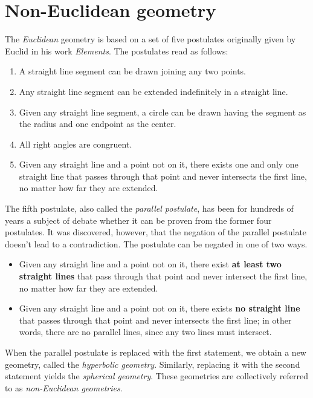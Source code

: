 \section{Non-Euclidean geometry}

The \textit{Euclidean} geometry is based on a set of five postulates originally given by Euclid in his work \textit{Elements}.
The postulates read as follows:
\begin{enumerate}
    \item A straight line segment can be drawn joining any two points.
    \item Any straight line segment can be extended indefinitely in a straight line.
    \item Given any straight line segment, a circle can be drawn having the segment as the radius and one endpoint as the center.
    \item All right angles are congruent.
    \item Given any straight line and a point not on it, there exists one and only one straight line that passes through that point and never intersects the first line, no matter how far they are extended.
\end{enumerate}
The fifth postulate, also called the \textit{parallel postulate}, has been for hundreds of years a subject of debate whether it can be proven from the former four postulates.
It was discovered, however, that the negation of the parallel postulate doesn't lead to a contradiction\cite{Parallel-Postulate}.
The postulate can be negated in one of two ways.
\begin{itemize}
    \item Given any straight line and a point not on it, there exist \textbf{at least two straight lines} that pass through that point and never intersect the first line, no matter how far they are extended.
    \item Given any straight line and a point not on it, there exists \textbf{no straight line} that passes through that point and never intersects the first line; in other words, there are no parallel lines, since any two lines must intersect.
\end{itemize}

When the parallel postulate is replaced with the first statement, we obtain a new geometry, called the \textit{hyperbolic geometry}.
Similarly, replacing it with the second statement yields the \textit{spherical geometry}.
These geometries are collectively referred to as \textit{non-Euclidean geometries}.



